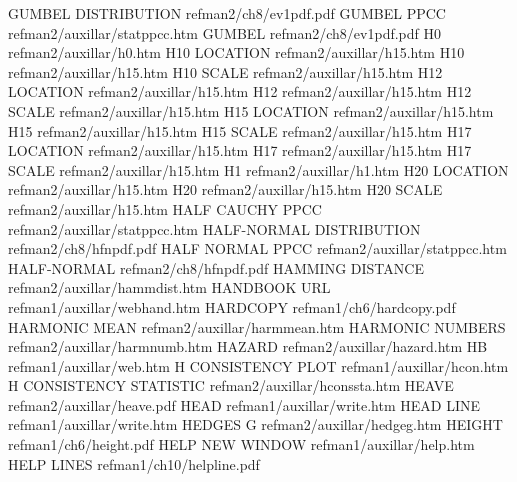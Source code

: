 GUMBEL DISTRIBUTION                     refman2/ch8/ev1pdf.pdf
GUMBEL PPCC                             refman2/auxillar/statppcc.htm
GUMBEL                                  refman2/ch8/ev1pdf.pdf
H0                                      refman2/auxillar/h0.htm
H10 LOCATION                            refman2/auxillar/h15.htm
H10                                     refman2/auxillar/h15.htm
H10 SCALE                               refman2/auxillar/h15.htm
H12 LOCATION                            refman2/auxillar/h15.htm
H12                                     refman2/auxillar/h15.htm
H12 SCALE                               refman2/auxillar/h15.htm
H15 LOCATION                            refman2/auxillar/h15.htm
H15                                     refman2/auxillar/h15.htm
H15 SCALE                               refman2/auxillar/h15.htm
H17 LOCATION                            refman2/auxillar/h15.htm
H17                                     refman2/auxillar/h15.htm
H17 SCALE                               refman2/auxillar/h15.htm
H1                                      refman2/auxillar/h1.htm
H20 LOCATION                            refman2/auxillar/h15.htm
H20                                     refman2/auxillar/h15.htm
H20 SCALE                               refman2/auxillar/h15.htm
HALF CAUCHY PPCC                        refman2/auxillar/statppcc.htm
HALF-NORMAL DISTRIBUTION                refman2/ch8/hfnpdf.pdf
HALF NORMAL PPCC                        refman2/auxillar/statppcc.htm
HALF-NORMAL                             refman2/ch8/hfnpdf.pdf
HAMMING DISTANCE                        refman2/auxillar/hammdist.htm
HANDBOOK URL                            refman1/auxillar/webhand.htm
HARDCOPY                                refman1/ch6/hardcopy.pdf
HARMONIC MEAN                           refman2/auxillar/harmmean.htm
HARMONIC NUMBERS                        refman2/auxillar/harmnumb.htm
HAZARD                                  refman2/auxillar/hazard.htm
HB                                      refman1/auxillar/web.htm
H CONSISTENCY PLOT                      refman1/auxillar/hcon.htm
H CONSISTENCY STATISTIC                 refman2/auxillar/hconssta.htm
HEAVE                                   refman2/auxillar/heave.pdf
HEAD                                    refman1/auxillar/write.htm
HEAD LINE                               refman1/auxillar/write.htm
HEDGES G                                refman2/auxillar/hedgeg.htm
HEIGHT                                  refman1/ch6/height.pdf
HELP NEW WINDOW                         refman1/auxillar/help.htm
HELP LINES                              refman1/ch10/helpline.pdf
